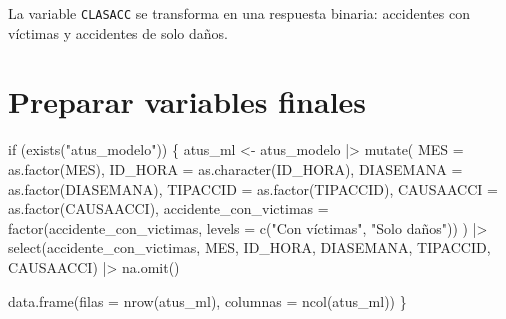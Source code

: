 \documentclass[
  spanish,
  11pt,
  letterpaper,
]{book}
\newenvironment{Shaded}{}{}
\newcommand{\AttributeTok}[1]{\textcolor[rgb]{0.84,0.23,0.29}{#1}}
\newcommand{\ControlFlowTok}[1]{\textcolor[rgb]{0.84,0.23,0.29}{#1}}
\newcommand{\FunctionTok}[1]{\textcolor[rgb]{0.44,0.26,0.76}{#1}}
\newcommand{\NormalTok}[1]{\textcolor[rgb]{0.14,0.16,0.18}{#1}}
\newcommand{\OtherTok}[1]{\textcolor[rgb]{0.44,0.26,0.76}{#1}}
\newcommand{\SpecialCharTok}[1]{\textcolor[rgb]{0.00,0.36,0.77}{#1}}
\newcommand{\StringTok}[1]{\textcolor[rgb]{0.01,0.18,0.38}{#1}}
\begin{document}
\begin{tcolorbox}[enhanced jigsaw, arc=.35mm, bottomrule=.15mm, bottomtitle=1mm, breakable, colback=white, colbacktitle=quarto-callout-note-color!10!white, colframe=quarto-callout-note-color-frame, coltitle=black, left=2mm, leftrule=.75mm, opacityback=0, opacitybacktitle=0.6, rightrule=.15mm, title=\textcolor{quarto-callout-note-color}{\faInfo}\hspace{0.5em}{Explicación del código}, titlerule=0mm, toprule=.15mm, toptitle=1mm]

La variable \texttt{CLASACC} se transforma en una respuesta binaria:
accidentes con víctimas y accidentes de solo daños.

\end{tcolorbox}

\section{Preparar variables finales}\label{preparar-variables-finales}

\begin{Shaded}
\begin{Highlighting}[]
\ControlFlowTok{if}\NormalTok{ (}\FunctionTok{exists}\NormalTok{(}\StringTok{"atus\_modelo"}\NormalTok{)) \{}
\NormalTok{  atus\_ml }\OtherTok{\textless{}{-}}\NormalTok{ atus\_modelo }\SpecialCharTok{|\textgreater{}}
    \FunctionTok{mutate}\NormalTok{(}
      \AttributeTok{MES =} \FunctionTok{as.factor}\NormalTok{(MES),}
      \AttributeTok{ID\_HORA =} \FunctionTok{as.character}\NormalTok{(ID\_HORA),}
      \AttributeTok{DIASEMANA =} \FunctionTok{as.factor}\NormalTok{(DIASEMANA),}
      \AttributeTok{TIPACCID =} \FunctionTok{as.factor}\NormalTok{(TIPACCID),}
      \AttributeTok{CAUSAACCI =} \FunctionTok{as.factor}\NormalTok{(CAUSAACCI),}
      \AttributeTok{accidente\_con\_victimas =} \FunctionTok{factor}\NormalTok{(accidente\_con\_victimas, }\AttributeTok{levels =} \FunctionTok{c}\NormalTok{(}\StringTok{"Con víctimas"}\NormalTok{, }\StringTok{"Solo daños"}\NormalTok{))}
\NormalTok{    ) }\SpecialCharTok{|\textgreater{}}
    \FunctionTok{select}\NormalTok{(accidente\_con\_victimas, MES, ID\_HORA, DIASEMANA, TIPACCID, CAUSAACCI) }\SpecialCharTok{|\textgreater{}}
    \FunctionTok{na.omit}\NormalTok{()}

  \FunctionTok{data.frame}\NormalTok{(}\AttributeTok{filas =} \FunctionTok{nrow}\NormalTok{(atus\_ml), }\AttributeTok{columnas =} \FunctionTok{ncol}\NormalTok{(atus\_ml))}
\NormalTok{\}}
\end{Highlighting}
\end{Shaded}
\end{document}
